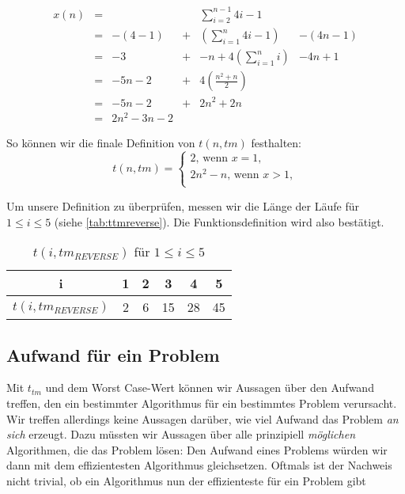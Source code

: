 \begin{align}
    x(n) &=&                &   & \sum_{i=2}^{n-1} 4i - 1     &            \\ 
         &=& -(4 - 1)       & + & (\sum_{i=1}^{n} 4i -1)      & - (4n - 1) \\
         &=& -3             & + & -n + 4 (\sum_{i=1}^{n} i)   &  - 4n + 1  \\
         &=& -5n -2         & + & 4 (\frac{n^2+n}{2})         &            \\
         &=& -5n -2         & + & 2 n^2 + 2n                  &            \\
         &=& 2n^2 -3n -2    &   &                             &            \label{eq:simp}
\end{align}

\noindent
So können wir die finale Definition von $t(n, tm)$ festhalten:
\[
    t(n, tm) = \begin{cases}
        2\text{, wenn } x = 1,\\
        2 n^2 -n \text{, wenn } x > 1,\\
    \end{cases}
\]

Um unsere Definition zu überprüfen, messen wir die Länge der Läufe für  $1 \leq i \leq 5$
(siehe \autoref{tab:ttmreverse}).
Die Funktionsdefinition wird also bestätigt.
\begin{table}[ht]
    \caption{$t(i,tm_{REVERSE})$ für $1 \leq i \leq 5$}
    \centering
    \begin{tabular}{c c c c c c}
    \toprule
          i
        & 1
        & 2
        & 3
        & 4
        & 5
        \\
        \midrule
          $t(i,tm_{REVERSE})$
        & 2
        & 6
        & 15
        & 28
        & 45
        \\
    \bottomrule
    \end{tabular}%
    \label{tab:ttmreverse}
\end{table}


\subsection{Aufwand für ein Problem}
Mit $t_{tm}$ und dem Worst Case-Wert können wir Aussagen über den Aufwand treffen,
den ein bestimmter Algorithmus für ein bestimmtes Problem verursacht.
Wir treffen allerdings keine Aussagen darüber,
wie viel Aufwand das Problem \emph{an sich} erzeugt.
Dazu müssten wir Aussagen über alle prinzipiell \emph{möglichen} Algorithmen,
die das Problem lösen:
Den Aufwand eines Problems würden wir dann mit dem effizientesten Algorithmus gleichsetzen.
Oftmals ist der Nachweis nicht trivial,
ob ein Algorithmus nun der effizienteste für ein Problem gibt

